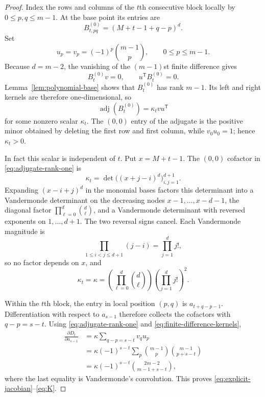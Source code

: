 \documentclass{amsart}
\numberwithin{equation}{section}
\theoremstyle{definition}
\theoremstyle{remark}
\newcommand{\transpose}{\mathsf T}
\begin{document}
\begin{proof}
Index the rows and columns of the $t$th consecutive block locally by $0\le p,q\le m-1$.  At the base point its entries are
\[
 B^{(0)}_{t,pq}=(M+t-1+q-p)^d.
\]
Set
\begin{equation}\label{eq:finite-difference-kernels}
 u_p=v_p=(-1)^p\binom{m-1}{p},
 \qquad 0\le p\le m-1.
\end{equation}
Because $d=m-2$, the vanishing of the $(m-1)$st finite difference gives
\[
 B_t^{(0)}v=0,
 \qquad
 u^{\transpose}B_t^{(0)}=0.
\]
Lemma~\ref{lem:polynomial-base} shows that $B_t^{(0)}$ has rank $m-1$.  Its left and right kernels are therefore one-dimensional, so
\begin{equation}\label{eq:adjugate-rank-one}
 \operatorname{adj}(B_t^{(0)})=\kappa_tvu^{\transpose}
\end{equation}
for some nonzero scalar $\kappa_t$.  The $(0,0)$ entry of the adjugate is the positive minor obtained by deleting the first row and first column, while $v_0u_0=1$; hence $\kappa_t>0$.

In fact this scalar is independent of $t$.  Put $x=M+t-1$.  The $(0,0)$ cofactor in \eqref{eq:adjugate-rank-one} is
\[
 \kappa_t=\det\bigl((x+j-i)^d\bigr)_{i,j=1}^{d+1}.
\]
Expanding $(x-i+j)^d$ in the monomial bases factors this determinant into a Vandermonde determinant on the decreasing nodes $x-1,\ldots,x-d-1$, the diagonal factor $\prod_{\ell=0}^d\binom d\ell$, and a Vandermonde determinant with reversed exponents on $1,\ldots,d+1$.  The two reversal signs cancel.  Each Vandermonde magnitude is
\[
 \prod_{1\le i<j\le d+1}(j-i)
 =\prod_{j=1}^{d}j!,
\]
so no factor depends on $x$, and
\begin{equation}\label{eq:kappa-closed}
 \kappa_t=\kappa=
 \left(\prod_{\ell=0}^{d}\binom d\ell\right)
 \left(\prod_{j=1}^{d}j!\right)^2.
\end{equation}

Within the $t$th block, the entry in local position $(p,q)$ is $a_{t+q-p-1}$.  Differentiation with respect to $a_{s-1}$ therefore collects the cofactors with $q-p=s-t$.  Using \eqref{eq:adjugate-rank-one} and \eqref{eq:finite-difference-kernels},
\begin{align*}
 \frac{\partial D_t}{\partial a_{s-1}}
 &=\kappa\sum_{q-p=s-t}v_qu_p\\
 &=\kappa(-1)^{s-t}
   \sum_p\binom{m-1}{p}\binom{m-1}{p+s-t}\\
 &=\kappa(-1)^{s-t}
   \binom{2m-2}{m-1+s-t},
\end{align*}
where the last equality is Vandermonde's convolution.  This proves \eqref{eq:explicit-jacobian}--\eqref{eq:K}.


\end{proof}
\end{document}
